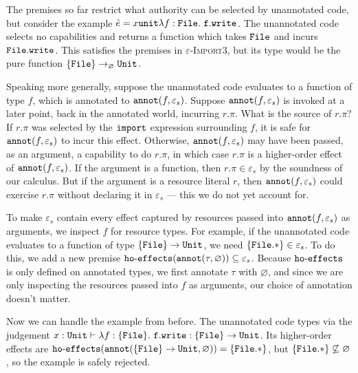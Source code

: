 The premises so far restrict what authority can be selected by
unannotated code, but consider the example
$\hat e = {x}{\mathtt{unit}}{\lambda f: { \mathtt{File}
  }.~\mathtt{f.write}}$. The unannotated code selects no capabilities and
returns a function which takes $\mathtt{File}$ and incurs
$\mathtt{File.write}$. This satisfies the premises in
\textsc{$\varepsilon$-Import3}, but its type would be the pure function
$\{ \mathtt{File} \} \rightarrow_{\varnothing} \mathtt{Unit}$.

Speaking more generally, suppose the unannotated code evaluates to a
function of type $f$, which is annotated to $\mathtt{annot}(f, \varepsilon_s)$.
Suppose $\mathtt{annot}(f, \varepsilon_s)$ is
invoked at a later point, back in the annotated world, incurring $r.\pi$.
 What is the source of $r.\pi$? If $r.\pi$ was selected by the
$\mathtt{import}$ expression surrounding $f$, it is safe for
$\mathtt{annot}(f, \varepsilon_s)$ to incur this effect. Otherwise,
$\mathtt{annot}(f, \varepsilon_s)$ may have been passed, as an argument,
a capability to do $r.\pi$, in which case $r.\pi$ is a higher-order effect
of $\mathtt{annot}(f, \varepsilon_s)$. If the argument
is a function, then $r.\pi \in \varepsilon_s$ by the soundness of our
calculus. But if the argument is a resource literal $r$, then
$\mathtt{annot}(f, \varepsilon_s)$ could exercise $r.\pi$ without declaring it
in $\varepsilon_s$ --- this we do not yet account for.

To make $\varepsilon_s$ contain every effect captured by resources
passed into $\mathtt{annot}(f, \varepsilon_s)$ as arguments, we inspect $f$
for resource types. For example, if the unannotated code evaluates to
a function of type $\mathtt{ \{ File \} \rightarrow \mathtt{Unit}}$, we need
$\mathtt{ \{ File.* \} } \in \varepsilon_s$. To do this, we add a new
premise $\mathtt{ho \hbox{-} effects}(\mathtt{annot}(\tau, \varnothing)) \subseteq
\varepsilon_s$. Because $\mathtt{ho \hbox{-} effects}$ is only defined on
annotated types, we first annotate $\tau$ with $\varnothing$, and since we
are only inspecting the resources passed into $f$ as arguments, our choice
of annotation doesn't matter.

Now we can handle the example from before. The unannotated code
types via the judgement
$x: \mathtt{Unit} \vdash \lambda f: \{ \mathtt{File} \}.~\mathtt{f.write}: \{ \mathtt{File} \}
\rightarrow \mathtt{Unit}$. Its higher-order effects are
$\mathtt{ho \hbox{-} effects}(\mathtt{annot}( \{ \mathtt{File} \} \rightarrow \mathtt{Unit}, \varnothing)) = \{
\mathtt{File.*} \}$, but $\{ \mathtt{File.*} \} \not\subseteq \varnothing$,
so the example is safely rejected.

